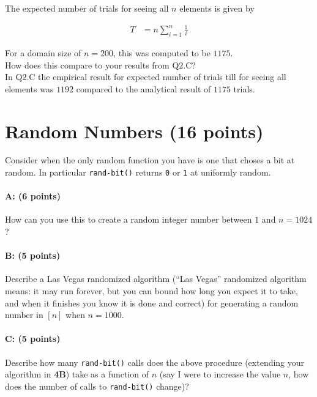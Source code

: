 \documentclass[11pt]{article}
\begin{document}
The expected number of trials for seeing all $n$ elements is given by

\begin{equation*}
\begin{aligned}
T&= n \sum_{i=1}^n \frac{1}{i}
\end{aligned}
\end{equation*}

For a domain size of $n=200$, this was computed to be $1175$.\\

How does this compare to your results from \textsf{Q2.C}?\\

In \textsf{Q2.C} the empirical result for expected number of trials till for seeing all elements was $1192$ compared to the analytical result of $1175$ trials.

\section{Random Numbers (16 points)}

Consider when the only random function you have is one that choses a bit at random.  In particular \texttt{rand-bit()} returns \texttt{0} or \texttt{1} at uniformly random.  

\paragraph{A: (6 points)}
How can you use this to create a random integer number between $1$ and $n=1024$?  

\paragraph{B: (5 points)}
Describe a Las Vegas randomized algorithm (``Las Vegas'' randomized algorithm means: it may run forever, but you can bound how long you expect it to take, and when it finishes you know it is done and correct) for generating a random number in $[n]$ when $n=1000$.  

\paragraph{C: (5 points)}  
Describe how many \texttt{rand-bit()} calls does the above procedure (extending your algorithm in \textbf{4B}) take as a function of $n$ (say I were to increase the value $n$, how does the number of calls to \texttt{rand-bit()} change)?  
\end{document}
